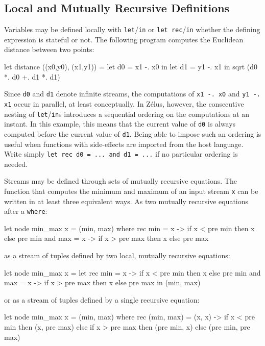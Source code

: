 \documentclass[11pt,titlepage,twoside]{report}
\makeatletter
\newcommand{\zls}[1]{{\@span{class="zelusinline"}#1}}
\newcommand{\zls}[1]{\texttt{#1}}
\renewcommand{\zls}[1]{\texttt{#1}}
\newcommand{\zelus}{{\sf Z\'elus}}
\makeatother
\begin{document}

\subsection{Local and Mutually Recursive Definitions\label{localdefmut}} %

Variables may be defined locally with \zls{let}/\zls{in} or
\zls{let rec}/\zls{in} whether the defining expression is stateful or not.
The following
program computes the Euclidean distance between two points:%
\begin{chklisting}
let distance ((x0,y0), (x1,y1)) =
  let d0 = x1 -. x0 in
  let d1 = y1 -. x1 in
  sqrt (d0 *. d0 +. d1 *. d1)
\end{chklisting}
Since \zls{d0} and \zls{d1} denote infinite streams, the computations of 
\zls{x1 -. x0} and \zls{y1 -. x1} occur in parallel, at least conceptually.
In \zelus, however, the consecutive nesting of \zls{let}/\zls{in}s 
introduces a sequential ordering on the computations at an instant.
In this example, this means that the current value of \zls{d0} is always 
computed before the current value of \zls{d1}.
Being able to impose such an ordering is useful when functions with 
side-effects are imported from the host language.
Write simply \zls{let rec d0 = ... and d1 = ...} if no particular ordering 
is needed.

Streams may be defined through sets of mutually recursive equations.  The
function that computes the minimum and maximum of an input stream
\zls{x} can be written in at least three equivalent ways.
As two mutually recursive equations after a \zls{where}:
\begin{chklisting}
let node min_max x = (min, max) where
  rec min = x -> if x < pre min then x else pre min
  and max = x -> if x > pre max then x else pre max
\end{chklisting}
as a stream of tuples defined by two local, mutually recursive equations:
\begin{chklisting}
let node min_max x =
  let rec min = x -> if x < pre min then x else pre min
      and max = x -> if x > pre max then x else pre max in
  (min, max)
\end{chklisting}
or as a stream of tuples defined by a single recursive equation:
\begin{chklisting}
let node min_max x = (min, max) where
  rec (min, max) = (x, x) -> if x < pre min then (x, pre max)
                             else if x > pre max then (pre min, x)
                             else (pre min, pre max)
\end{chklisting}
\end{document}
